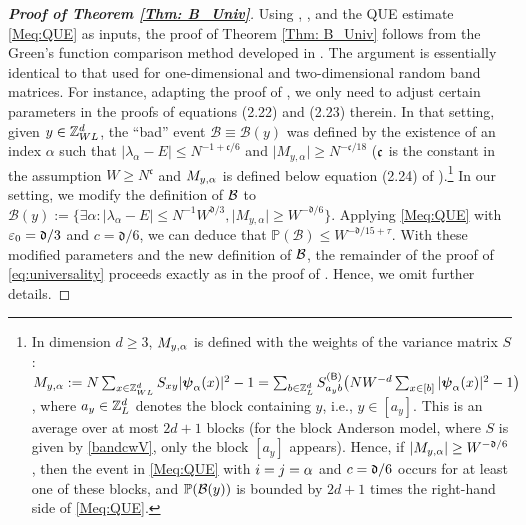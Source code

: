 \begin{proof}[\bf Proof of Theorem \ref{Thm: B_Univ}]
Using , , and the QUE estimate \eqref{Meq:QUE} as inputs, the proof of Theorem \ref{Thm: B_Univ} follows from the Green's function comparison method developed in \cite{Xu:2024aa}. 
The argument is essentially identical to that used for one-dimensional \cite[Theorem~2.6]{YY_25} and two-dimensional \cite[Theorem~2.6]{DYYY25} random band matrices. For instance, adapting the proof of \cite[Theorem~2.6]{DYYY25}, we only need to adjust certain parameters in the proofs of equations (2.22) and (2.23) therein.
In that setting, given $y\in \ZL$, the ``bad'' event $\mathcal{B}\equiv \mathcal{B}(y)$ was defined by the existence of an index $\alpha$ such that $\lvert \lambda_\alpha - E\rvert \le N^{-1+\mathfrak{c}/6}$ and $\lvert M_{y,\alpha}\rvert \ge N^{-\mathfrak{c}/18}$ ($\fc$ is the constant in the assumption $W \ge N^{\mathfrak{c}}$ and $M_{y,\al}$ is defined below equation (2.24) of \cite{DYYY25}).\footnote{In dimension $d\ge 3$, $M_{y,\al}$ is defined with the weights of the variance matrix $S$: $M_{y,\al}:=N\sum_{x\in\ZL}S_{xy}|\bpsi_\al(x)|^2-1=\sum_{b\in\Zn}S^{(\sB)}_{a_yb}\big(NW^{-d}\sum_{x\in[b]}|\bpsi_\al(x)|^2-1\big)$, where $a_y\in\Zn$ denotes the block containing $y$, i.e., $y\in[a_y]$. This is an average over at most $2d+1$ blocks (for the block Anderson model, where $S$ is given by \eqref{bandcwV}, only the block $[a_y]$ appears). Hence, if $|M_{y,\al}|\ge W^{-\fd/6}$, then the event in \eqref{Meq:QUE} with $i=j=\al$ and $c=\fd/6$ occurs for at least one of these blocks, and $\P(\mathcal B(y))$ is bounded by $2d+1$ times the right-hand side of \eqref{Meq:QUE}.} In our setting, we modify the definition of $\cal B$ to
\(
\mathcal{B}(y)
:= \bigl\{ \exists \alpha: \lvert \lambda_\alpha - E\rvert \le N^{-1} W^{\mathfrak{d}/3}, \lvert M_{y,\alpha}\rvert \ge W^{-\mathfrak{d}/6} \bigr\}.
\)
Applying \eqref{Meq:QUE} with $\e_0=\mathfrak{d}/3$ and $c=\mathfrak{d}/6$, we can deduce that
\(
\mathbb{P}(\mathcal{B}) \le W^{-\mathfrak{d}/15+\tau}.
\)
With these modified parameters and the new definition of $\cal B$, the remainder of the proof of \eqref{eq:universality} proceeds exactly as in the proof of \cite[Theorem~2.6]{DYYY25}. %
Hence, we omit further details.
\end{proof}

